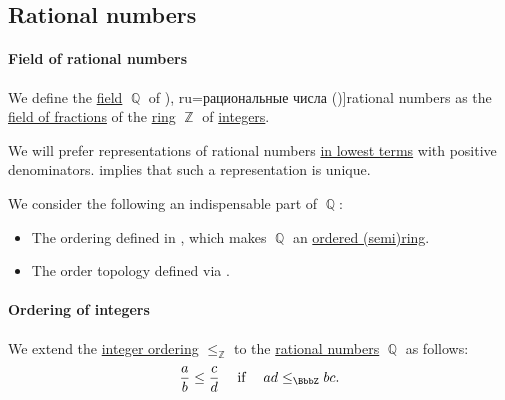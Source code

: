 \subsection{Rational numbers}\label{subsec:rational_numbers}

\paragraph{Field of rational numbers}

\begin{definition}\label{def:rational_numbers}
  We define the \hyperref[def:field]{field} \( \BbbQ \) of \term[bg=рационални числа (\cite[18]{Тагамлицки1971Диф}), ru=рациональные числа (\cite[def. 22.1]{ЭнциклопедияЕлементарнойМатематикиТом1})]{rational numbers} as the \hyperref[thm:field_of_fractions]{field of fractions} of the \hyperref[def:ring]{ring} \( \BbbZ \) of \hyperref[def:integers]{integers}.
\end{definition}
\begin{comments}
  \item We will prefer representations of rational numbers \hyperref[def:lowest_terms]{in lowest terms} with positive denominators.  implies that such a representation is unique.

  \item We consider the following an indispensable part of \( \BbbQ \):
  \begin{itemize}
    \item The ordering defined in , which makes \( \BbbQ \) an \hyperref[def:ordered_semiring]{ordered (semi)ring}.
    \item The order topology defined via .
  \end{itemize}
\end{comments}

\paragraph{Ordering of integers}

\begin{definition}\label{def:rational_numbers_ordering}
  We extend the \hyperref[def:integer_ordering]{integer ordering} \( \leq_\BbbZ \) to the \hyperref[def:rational_numbers]{rational numbers} \( \BbbQ \) as follows:
  \begin{equation*}
    \frac a b \leq \frac c d \quad\T{if}\quad ad \leq_\BbbZ bc.
  \end{equation*}
\end{definition}

